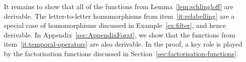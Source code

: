 It remains to show that all of the functions from Lemma~\ref{lem:schlingloff} are derivable. 
The letter-to-letter homomorphisms from item~\ref{it:relabelling} are   a special case of homomorphisms discussed in Example~\ref{ex:filter}, and hence derivable. In Appendix~\ref{sec:AppendixForat}, we show that the functions from item~\ref{it:temporal-operators} are also derivable. In the proof, a key role is played by the factorisation functions discussed in Section~\ref{sec:factorisation-functions}. 
